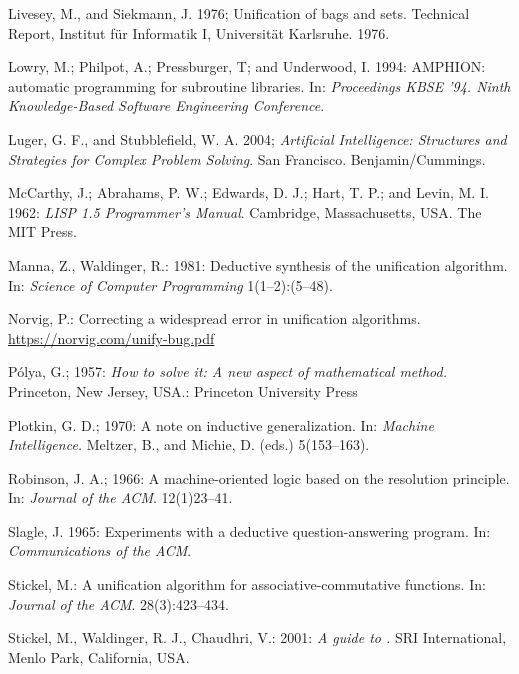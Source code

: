 \documentclass[runningheads]{llncs}
\begin{document}
\begin{thebibliography}{apalike}
\citep{liv-siek:acu}
Livesey, M., and Siekmann, J. 1976;
Unification of bags and sets.
Technical Report, Institut für Informatik I, Universität Karlsruhe.
1976.

\citep{low}
Lowry, M.; Philpot, A.; Pressburger, T; and Underwood, I. 1994: AMPHION: automatic programming for subroutine libraries. In: \emph{Proceedings KBSE '94. Ninth Knowledge-Based Software Engineering Conference}.

\citep{lug}
Luger, G. F., and Stubblefield, W. A. 2004;
\emph{Artificial Intelligence: Structures and Strategies for Complex Problem Solving}.   San Francisco. Benjamin/Cummings.

\citep{jmc}
McCarthy, J.; Abrahams, P. W.; Edwards, D. J.; Hart, T. P.; and Levin, M. I. 1962: \emph{LISP 1.5 Programmer's Manual}.  Cambridge, Massachusetts, USA.
The MIT Press.

\citep{man:wal}
Manna, Z., Waldinger, R.: 
1981: Deductive synthesis of the unification algorithm. In: \emph{Science of Computer Programming} 1(1--2):(5--48).

\citep{nor}
Norvig, P.: 
Correcting a widespread error in unification algorithms.
\url{https://norvig.com/unify-bug.pdf}

\citep{pol}
Pólya, G.;
1957: \emph{How to solve it: A new aspect of mathematical method.}
Princeton, New Jersey, USA.: Princeton University Press

\citep{plo:au}
Plotkin, G. D.; 1970: A note on inductive generalization. In: \emph{Machine Intelligence.}  Meltzer, B., and Michie, D. (eds.) 5(153–163).

\citep{rob}
Robinson, J. A.; 1966: A machine-oriented logic based on the resolution principle. In:
\emph{Journal of the ACM}.
 12(1)23–41.
 
\citep{sla}
Slagle, J. 1965: Experiments with a deductive question-answering program. In: \emph{Communications of the ACM}.

\citep{sti:acu}
Stickel, M.: A unification algorithm for associative-commutative functions. In: \emph{Journal of the ACM}. 28(3):423--434.

\citep{sti}
Stickel, M., Waldinger, R. J.,  Chaudhri, V.: 
2001: \emph{A guide to \SNARK.} SRI International, Menlo Park, California, USA.


\end{thebibliography}
\end{document}
